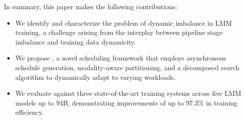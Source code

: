 In summary, this paper makes the following contributions:

\begin{itemize}
    \item We identify and characterize the problem of dynamic imbalance in LMM training, a challenge arising from the interplay between pipeline stage imbalance and training data dynamicity.
    \item We propose \sys{}, a novel scheduling framework that employs asynchronous schedule generation, modality-aware partitioning, and a decomposed search algorithm to dynamically adapt to varying workloads.
    \item We evaluate \sys{} against three state-of-the-art training systems across five LMM models up to 94B, demonstrating improvements of up to 97.3\% in training efficiency.
\end{itemize}
